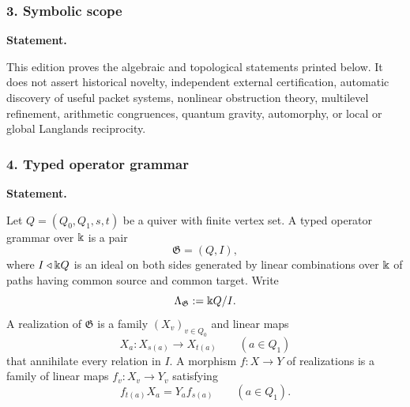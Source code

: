 \subsubsection*{3. Symbolic scope}
\label{rec:PSC-I-B-SYMBOLIC-SCOPE}
\textbf{Statement.}\par
This edition proves the algebraic and topological statements printed below.  It does not assert historical novelty, independent external certification, automatic discovery of useful packet systems, nonlinear obstruction theory, multilevel refinement, arithmetic congruences, quantum gravity, automorphy, or local or global Langlands reciprocity.
\subsubsection*{4. Typed operator grammar}
\label{rec:PSC-I-D-TYPED-GRAMMAR}
\textbf{Statement.}\par
Let $Q=(Q_0,Q_1,s,t)$ be a quiver with finite vertex set.  A typed operator grammar over $\Bbbk$ is a pair
\[
\mathfrak G=(Q,I),
\]
where $I\triangleleft \Bbbk Q$ is an ideal on both sides generated by linear combinations over $\Bbbk$ of paths having common source and common target.  Write
\[
\Lambda_{\mathfrak G}:=\Bbbk Q/I.
\]
A realization of $\mathfrak G$ is a family $(X_v)_{v\in Q_0}$ and linear maps
\[
X_a:X_{s(a)}\longrightarrow X_{t(a)}
\qquad(a\in Q_1)
\]
that annihilate every relation in $I$.  A morphism $f:X\to Y$ of realizations is a family of linear maps $f_v:X_v\to Y_v$ satisfying
\[
f_{t(a)}X_a=Y_af_{s(a)}
\qquad(a\in Q_1).
\]
